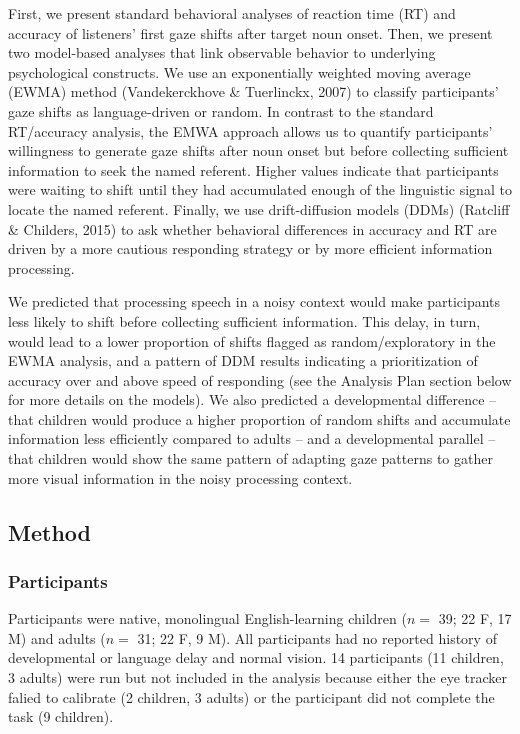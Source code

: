 \documentclass[10pt, letterpaper]{article}
\begin{document}
First, we present standard behavioral analyses of reaction time (RT) and
accuracy of listeners' first gaze shifts after target noun onset. Then,
we present two model-based analyses that link observable behavior to
underlying psychological constructs. We use an exponentially weighted
moving average (EWMA) method (Vandekerckhove \& Tuerlinckx, 2007) to
classify participants' gaze shifts as language-driven or random. In
contrast to the standard RT/accuracy analysis, the EMWA approach allows
us to quantify participants' willingness to generate gaze shifts after
noun onset but before collecting sufficient information to seek the
named referent. Higher values indicate that participants were waiting to
shift until they had accumulated enough of the linguistic signal to
locate the named referent. Finally, we use drift-diffusion models (DDMs)
(Ratcliff \& Childers, 2015) to ask whether behavioral differences in
accuracy and RT are driven by a more cautious responding strategy or by
more efficient information processing.

We predicted that processing speech in a noisy context would make
participants less likely to shift before collecting sufficient
information. This delay, in turn, would lead to a lower proportion of
shifts flagged as random/exploratory in the EWMA analysis, and a pattern
of DDM results indicating a prioritization of accuracy over and above
speed of responding (see the Analysis Plan section below for more
details on the models). We also predicted a developmental difference --
that children would produce a higher proportion of random shifts and
accumulate information less efficiently compared to adults -- and a
developmental parallel -- that children would show the same pattern of
adapting gaze patterns to gather more visual information in the noisy
processing context.

\subsection{Method}\label{method}

\subsubsection{Participants}\label{participants}

Participants were native, monolingual English-learning children (\(n=\)
39; 22 F, 17 M) and adults (\(n=\) 31; 22 F, 9 M). All participants had
no reported history of developmental or language delay and normal
vision. 14 participants (11 children, 3 adults) were run but not
included in the analysis because either the eye tracker falied to
calibrate (2 children, 3 adults) or the participant did not complete the
task (9 children).
\end{document}
